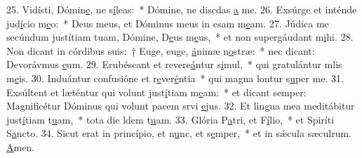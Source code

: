 25. Vidísti, Dómin\uline{e}, ne s\uline{í}leas:~* Dómine, ne discdas \uline{a} me.
26. Exsúrge et inténde jud\uline{í}cio m\uline{e}o:~* Deus meus, et Dóminus meus in csam m\uline{e}am.
27. Júdica me secúndum justítiam tuam, Dómine, D\uline{e}us m\uline{e}us,~* et non supergáudant m\uline{i}hi.
28. Non dicant in córdibus suis:~† Euge, euge, \uline{á}nimæ n\uline{o}stræ:~* nec dicant: Devorávmus \uline{e}um.
29. Erubéscant et revere\uline{á}ntur s\uline{i}mul,~* qui gratulántur mlis m\uline{e}is.
30. Induántur confusióne et r\uline{e}ver\uline{é}ntia~* qui magna lontur s\uline{u}per me.
31. Exsúltent et læténtur qui volunt just\uline{í}tiam m\uline{e}am:~* et dicant semper: Magnificétur Dóminus qui volunt pacem srvi \uline{e}jus.
32. Et lingua mea meditábitur just\uline{í}tiam t\uline{u}am,~* tota die ldem t\uline{u}am.
33. Glória P\uline{a}tri, et F\uline{í}lio,~* et Spiríti S\uline{a}ncto.
34. Sicut erat in princípio, et n\uline{u}nc, et s\uline{e}mper,~* et in sǽcula sæculrum. \uline{A}men.
